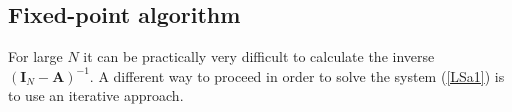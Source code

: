 \documentclass[10pt, conference, letterpaper]{IEEEtran}
\newcommand{\blue}[1]{\textcolor{blue}{#1}}
\begin{document}
{%
%


\subsection{Fixed-point algorithm}

For large $N$ it can be practically very difficult to calculate the inverse $\left(\mathbf{I}_N-\mathbf{A}\right)^{-1}$. A different way to proceed in order to solve the system (\ref{LSa1}) is to use an iterative approach.



}
\end{document}

